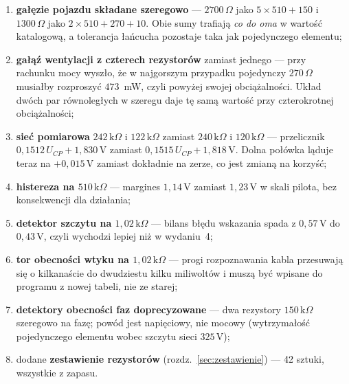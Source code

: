 \documentclass[a4paper,11pt]{article}
\newcommand{\ohm}{\,\Omega}
\newcommand{\kohm}{\,\mathrm{k}\Omega}
\newcommand{\volt}{\,\mathrm{V}}
\begin{document}
\begin{enumerate}
\item \textbf{gałęzie pojazdu składane szeregowo} --- $2700\ohm$ jako
      $5\times510+150$ i $1300\ohm$ jako $2\times510+270+10$. Obie sumy trafiają
      \emph{co do oma} w wartość katalogową, a tolerancja łańcucha pozostaje taka
      jak pojedynczego elementu;
\item \textbf{gałąź wentylacji z czterech rezystorów} zamiast jednego --- przy
      rachunku mocy wyszło, że w najgorszym przypadku pojedynczy $270\ohm$ musiałby
      rozproszyć $473$~mW, czyli powyżej swojej obciążalności. Układ dwóch par
      równoległych w szeregu daje tę samą wartość przy czterokrotnej obciążalności;
\item \textbf{sieć pomiarowa} $242\kohm$ i $122\kohm$ zamiast $240\kohm$
      i $120\kohm$ --- przelicznik $0{,}1512\,U_{CP}+1{,}830\volt$ zamiast
      $0{,}1515\,U_{CP}+1{,}818\volt$. Dolna połówka ląduje teraz na
      $+0{,}015\volt$ zamiast dokładnie na zerze, co jest zmianą na korzyść;
\item \textbf{histereza na $510\kohm$} --- margines $1{,}14\volt$ zamiast
      $1{,}23\volt$ w skali pilota, bez konsekwencji dla działania;
\item \textbf{detektor szczytu na $1{,}02\kohm$} --- bilans błędu wskazania spada
      z $0{,}57\volt$ do $0{,}43\volt$, czyli wychodzi lepiej niż w wydaniu~4;
\item \textbf{tor obecności wtyku na $1{,}02\kohm$} --- progi rozpoznawania kabla
      przesuwają się o kilkanaście do dwudziestu kilku miliwoltów i muszą być
      wpisane do programu z nowej tabeli, nie ze starej;
\item \textbf{detektory obecności faz doprecyzowane} --- dwa rezystory $150\kohm$
      szeregowo na fazę; powód jest napięciowy, nie mocowy (wytrzymałość
      pojedynczego elementu wobec szczytu sieci $325\volt$);
\item dodane \textbf{zestawienie rezystorów} (rozdz.~\ref{sec:zestawienie}) ---
      42 sztuki, wszystkie z zapasu.
\end{enumerate}
\end{document}
